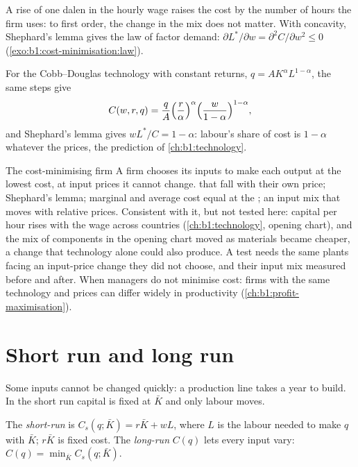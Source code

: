 A rise of one dalen in the hourly wage raises the cost by the number of
hours the firm uses: to first order, the change in the mix does not matter.
With concavity, Shephard's lemma gives the law of factor demand:
$\partial L^*/\partial w = \partial^2C/\partial w^2 \le 0$
(\cref{exo:b1:cost-minimisation:law}).

For the Cobb--Douglas technology with constant returns, $q = AK^\alpha L^{1-\alpha}$,
the same steps give
\[
C(w, r, q) = \frac qA\Bigl(\frac r\alpha\Bigr)^\alpha\Bigl(\frac w{1 - \alpha}\Bigr)^{1-\alpha},
\]
and Shephard's lemma gives $wL^*/C = 1 - \alpha$: labour's share of cost is
$1 - \alpha$ whatever the prices, the prediction of \cref{ch:b1:technology}.

\begin{model}{The cost-minimising firm}
\assumes A firm chooses its inputs to make each output at the lowest cost,
at input prices it cannot change.
\predicts {} that fall with their own price;
Shephard's lemma; marginal and average cost equal at the ; an input mix that moves with relative prices.
\tested Consistent with it, but not tested here: capital per hour rises
with the wage across countries (\cref{ch:b1:technology}, opening chart), and
the mix of components in the opening chart moved as materials became
cheaper, %
a change that technology alone could also produce. A test needs the same
plants facing an input-price change they did not choose, and their input
mix measured before and after.
\breaks When managers do not minimise cost: firms with the same technology
and prices can differ widely in productivity
(\cref{ch:b1:profit-maximisation}).
\end{model}

\section{Short run and long run}\label{sec:b1:cost-minimisation:short-run}

Some inputs cannot be changed quickly: a production line takes a year to
build. In the short run capital is fixed at $\bar K$ and only labour moves.

\begin{definition}\label{def:b1:cost-minimisation:sr-lr}
The \emph{short-run } is $C_s(q; \bar K) = r\bar K + wL$, where $L$
is the labour needed to make $q$ with $\bar K$; $r\bar K$ is fixed cost. The
\emph{long-run } $C(q)$ lets every input vary:
$C(q) = \min_{\bar K} C_s(q; \bar K)$.
\end{definition}

